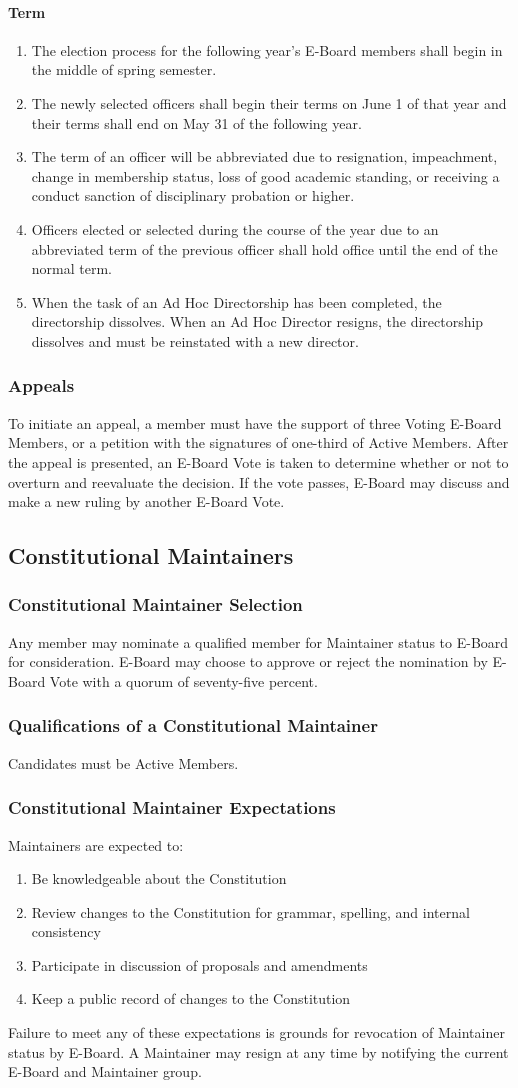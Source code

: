 \documentclass{article}
\newcommand{\asection}[1]{\subsection{#1} \label{#1}}
\newcommand{\asubsection}[1]{\subsubsection{#1} \label{#1}}
\newcommand{\asubsubsection}[1]{\paragraph{#1} \label{#1}}
\begin{document}
\asubsubsection{Term}
\begin{enumerate}
	\item The election process for the following year's E-Board members shall begin in the middle of spring semester.
	\item The newly selected officers shall begin their terms on June 1 of that year and their terms shall end on May 31 of the following year.
	\item The term of an officer will be abbreviated due to resignation, impeachment, change in membership status, loss of good academic standing, or receiving a conduct sanction of disciplinary probation or higher.
	\item Officers elected or selected during the course of the year due to an abbreviated term of the previous officer shall hold office until the end of the normal term.
	\item When the task of an Ad Hoc Directorship has been completed, the directorship dissolves.
	      When an Ad Hoc Director resigns, the directorship dissolves and must be reinstated with a new director.
\end{enumerate}

\asubsection{Appeals}
To initiate an appeal, a member must have the support of three Voting E-Board Members, or a petition with the signatures of one-third of Active Members.
After the appeal is presented, an E-Board Vote is taken to determine whether or not to overturn and reevaluate the decision.
If the vote passes, E-Board may discuss and make a new ruling by another E-Board Vote.

\asection{Constitutional Maintainers}

\asubsection{Constitutional Maintainer Selection}
Any member may nominate a qualified member for Maintainer status to E-Board for consideration.
E-Board may choose to approve or reject the nomination by E-Board Vote with a quorum of seventy-five percent.

\asubsection{Qualifications of a Constitutional Maintainer}
Candidates must be Active Members.

\asubsection{Constitutional Maintainer Expectations}
Maintainers are expected to:
\begin{enumerate}
	\item Be knowledgeable about the Constitution
	\item Review changes to the Constitution for grammar, spelling, and internal consistency
	\item Participate in discussion of proposals and amendments
	\item Keep a public record of changes to the Constitution
\end{enumerate}
Failure to meet any of these expectations is grounds for revocation of Maintainer status by E-Board.
A Maintainer may resign at any time by notifying the current E-Board and Maintainer group.
\end{document}
